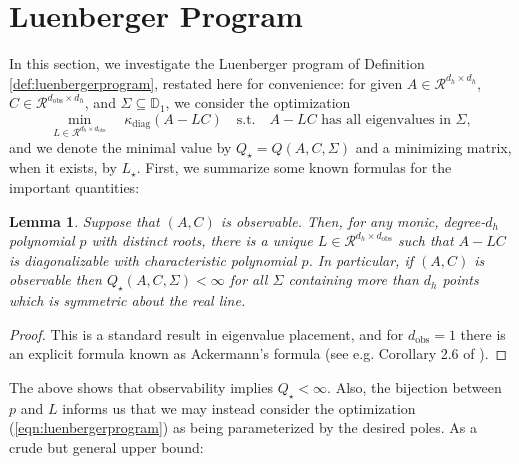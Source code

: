 \documentclass[11pt]{article}
\renewcommand{\subset}{\subseteq}
\def\R{{\mathcal R}}
\def\R{\ensuremath{\mathcal R}}
\newtheorem{lemma}[theorem]{Lemma}
\numberwithin{equation}{section}
\begin{document}
\section{Luenberger Program}
\label{appendix:luenbergerprogram}


In this section, we investigate the Luenberger program of Definition \ref{def:luenbergerprogram}, restated here for convenience: for given $A \in \R^{d_h \times d_h}$, $C \in \R^{d_{\textrm{obs}}\times d_h}$, and $\Sigma \subset \mathbb{D}_1$, we consider the optimization
\begin{equation}
\label{eqn:luenbergerprogram}
\min_{L \in \R^{d_h \times d_{\textrm{obs}}}} \quad \kappa_{\textrm{diag}}(A-LC) \quad \text{s.t.} \quad A-LC \text{ has all eigenvalues in $\Sigma$},\end{equation}
    and we denote the minimal value by $Q_\star = Q(A, C, \Sigma)$ and a minimizing matrix, when it exists, by $L_\star$. First, we summarize some known formulas for the important quantities:
\begin{lemma}
\label{lemma:ackermann}
    Suppose that $(A, C)$ is observable. Then, for any monic, degree-$d_h$ polynomial $p$ with distinct roots, there is a unique $L \in \R^{d_h \times d_{\textrm{obs}}}$ such that $A - LC$ is diagonalizable with characteristic polynomial $p$. In particular, if $(A, C)$ is observable then $Q_\star(A, C, \Sigma) < \infty$ for all $\Sigma$ containing more than $d_h$ points which is symmetric about the real line. 
\end{lemma}
\begin{proof}
This is a standard result in eigenvalue placement, and for $d_{\text{obs}}=1$ there is an explicit formula known as Ackermann's formula (see e.g. Corollary 2.6 of \cite{Mehrmann1996}).
\end{proof}
The above shows that observability implies $Q_\star < \infty$. Also, the bijection between $p$ and $L$ informs us that we may instead consider the optimization (\ref{eqn:luenbergerprogram}) as being parameterized by the desired poles. 
As a crude but general upper bound:
\end{document}
